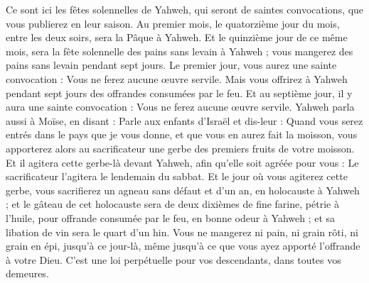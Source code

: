\begin{multicols}{2}
Ce sont ici les fêtes solennelles de Yahweh, qui seront de saintes convocations, que vous publierez en leur saison.
Au premier mois, le quatorzième jour du mois, entre les deux soirs, sera la Pâque à Yahweh.
Et le quinzième jour de ce même mois, sera la fête solennelle des pains sans levain à Yahweh ; vous mangerez des pains sans levain pendant sept jours.
Le premier jour, vous aurez une sainte convocation : Vous ne ferez aucune œuvre servile.
Mais vous offrirez à Yahweh pendant sept jours des offrandes consumées par le feu. Et au septième jour, il y aura une sainte convocation : Vous ne ferez aucune œuvre servile.
Yahweh parla aussi à Moïse, en disant :
Parle aux enfants d'Israël et dis-leur : Quand vous serez entrés dans le pays que je vous donne, et que vous en aurez fait la moisson, vous apporterez alors au sacrificateur une gerbe des premiers fruits de votre moisson.
Et il agitera cette gerbe-là devant Yahweh, afin qu'elle soit agréée pour vous : Le sacrificateur l'agitera le lendemain du sabbat.
Et le jour où vous agiterez cette gerbe, vous sacrifierez un agneau sans défaut et d'un an, en holocauste à Yahweh ;
et le gâteau de cet holocauste sera de deux dixièmes de fine farine, pétrie à l'huile, pour offrande consumée par le feu, en bonne odeur à Yahweh ; et sa libation de vin sera le quart d'un hin.
Vous ne mangerez ni pain, ni grain rôti, ni grain en épi, jusqu'à ce jour-là, même jusqu'à ce que vous ayez apporté l'offrande à votre Dieu. C'est une loi perpétuelle pour vos descendants, dans toutes vos demeures.

\end{multicols}
